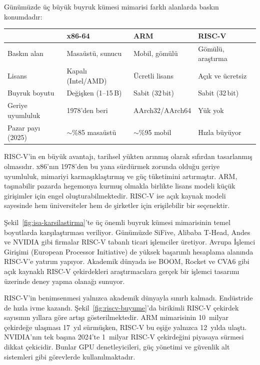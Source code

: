 \begin{karsilastirma}
Günümüzde üç büyük buyruk kümesi mimarisi farklı alanlarda baskın konumdadır:

\begin{center}
\small
\begin{tabular}{lp{3cm}p{3cm}p{3cm}}
\toprule
 & \textbf{x86-64} & \textbf{ARM} & \textbf{RISC-V} \\
\midrule
Baskın alan & Masaüstü, sunucu & Mobil, gömülü & Gömülü, araştırma \\
Lisans & Kapalı (Intel/AMD) & Ücretli lisans & Açık ve ücretsiz \\
Buyruk boyutu & Değişken (1--15\,B) & Sabit (32\,bit) & Sabit (32\,bit) \\
Geriye uyumluluk & 1978'den beri & AArch32/AArch64 & Yük yok \\
Pazar payı (2025) & $\sim$\%85 masaüstü & $\sim$\%95 mobil & Hızla büyüyor \\
\bottomrule
\end{tabular}
\end{center}

RISC-V'in en büyük avantajı, tarihsel yükten arınmış olarak sıfırdan tasarlanmış olmasıdır. x86'nın 1978'den bu yana sürdürmek zorunda olduğu geriye uyumluluk, mimariyi karmaşıklaştırmış ve güç tüketimini artırmıştır. ARM, taşınabilir pazarda hegemonya kurmuş olmakla birlikte lisans modeli küçük girişimler için engel oluşturabilmektedir. RISC-V ise açık kaynak modeli sayesinde hem üniversiteler hem de şirketler için erişilebilir bir seçenektir.
\end{karsilastirma}

Şekil~\ref{fig:isa-karsilastirma}'te üç önemli buyruk kümesi mimarisinin temel boyutlarda karşılaştırması veriliyor. Günümüzde SiFive, Alibaba T-Head, Andes ve NVIDIA gibi firmalar RISC-V tabanlı ticari işlemciler üretiyor. Avrupa İşlemci Girişimi (European Processor Initiative) de yüksek başarımlı hesaplama alanında RISC-V'e yatırım yapıyor. Akademik dünyada ise BOOM, Rocket ve CVA6 gibi açık kaynaklı RISC-V çekirdekleri araştırmacılara gerçek bir işlemci tasarımı üzerinde deney yapma olanağı sunuyor.

RISC-V'in benimsenmesi yalnızca akademik dünyayla sınırlı kalmadı. Endüstride de hızla ivme kazandı. Şekil~\ref{fig:riscv-buyume}'da birikimli RISC-V çekirdek sayısının yıllara göre artışı gösterilmektedir. ARM mimarisinin 10~milyar çekirdeğe ulaşması 17~yıl sürmüşken, RISC-V bu eşiğe yalnızca 12~yılda ulaştı. NVIDIA'nın tek başına 2024'te 1~milyar RISC-V çekirdeğini piyasaya sürmesi dikkat çekicidir. Bunlar GPU denetleyicileri, güç yönetimi ve güvenlik alt sistemleri gibi görevlerde kullanılmaktadır.

